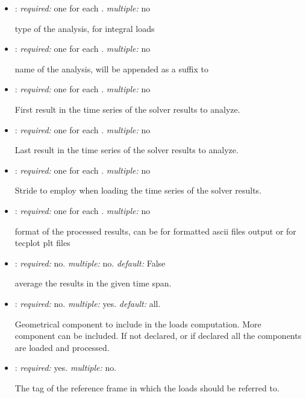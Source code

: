 \begin{itemize}
\item {}: \textit{required:} one for each . \textit{multiple:} no

type of the analysis,  for integral loads

\item {}: \textit{required:} one for each . \textit{multiple:} no

name of the analysis, will be appended as a suffix to 

\item {}: \textit{required:} one for each . \textit{multiple:} no

First result in the time series of the solver results to analyze.

\item {}: \textit{required:} one for each . \textit{multiple:} no

Last result in the time series of the solver results to analyze.

\item {}: \textit{required:} one for each . \textit{multiple:} no

Stride to employ when loading the time series of the solver results. 

\item {}: \textit{required:} one for each . \textit{multiple:} no

format of the processed results, can be  for formatted ascii files output or 
 for tecplot plt files

\item {}: \textit{required:} no. \textit{multiple:} no. \textit{default:} False

average the results in the given time span.

\item {}: \textit{required:} no. \textit{multiple:} yes. \textit{default:} all.

Geometrical component to include in the loads computation. More component can be included. 
If not declared, or if declared  all the components are loaded and processed. 

\item {}: \textit{required:} yes. \textit{multiple:} no.

The tag of the reference frame in which the loads should be referred to. 

\end{itemize}

